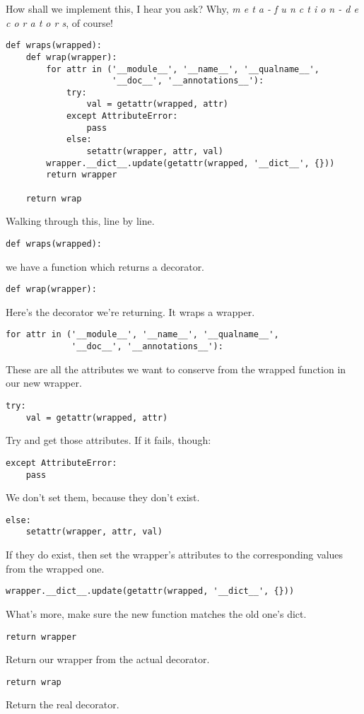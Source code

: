 \documentclass[11pt]{article}
\begin{document}
How shall we implement this, I hear you ask? Why, \emph{m e t a - f u n c
t i o n - d e c o r a t o r s}, of course!
\begin{verbatim}
def wraps(wrapped):
    def wrap(wrapper):
        for attr in ('__module__', '__name__', '__qualname__',
                     '__doc__', '__annotations__'):
            try:
                val = getattr(wrapped, attr)
            except AttributeError:
                pass
            else:
                setattr(wrapper, attr, val)
        wrapper.__dict__.update(getattr(wrapped, '__dict__', {}))
        return wrapper

    return wrap
\end{verbatim}

Walking through this, line by line.

\begin{verbatim}
def wraps(wrapped):
\end{verbatim}
we have a function which returns a decorator.
\begin{verbatim}
def wrap(wrapper):
\end{verbatim}
Here's the decorator we're returning. It wraps a wrapper.
\begin{verbatim}
for attr in ('__module__', '__name__', '__qualname__',
             '__doc__', '__annotations__'):
\end{verbatim}
These are all the attributes we want to conserve from the wrapped
function in our new wrapper.
\begin{verbatim}
try:
    val = getattr(wrapped, attr)
\end{verbatim}
Try and get those attributes. If it fails, though:
\begin{verbatim}
except AttributeError:
    pass
\end{verbatim}
We don't set them, because they don't exist.
\begin{verbatim}
else:
    setattr(wrapper, attr, val)
\end{verbatim}
If they do exist, then set the wrapper's attributes to the
corresponding values from the wrapped one.
\begin{verbatim}
wrapper.__dict__.update(getattr(wrapped, '__dict__', {}))
\end{verbatim}
What's more, make sure the new function matches the old one's dict.
\begin{verbatim}
return wrapper
\end{verbatim}
Return our wrapper from the actual decorator.
\begin{verbatim}
return wrap
\end{verbatim}
Return the real decorator.
\end{document}
